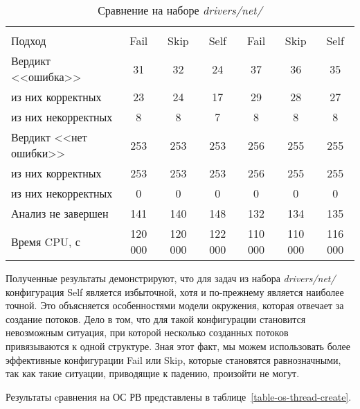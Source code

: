   \begin{table}[h]\footnotesize \centering
    \caption{Сравнение на наборе \textit{drivers/net/}}
  	\label{table-drivers-thread-create}
    \begin{tabular}{ | l | c | c | c | c | c | c |}
      \hline
      				& 		\multicolumn{3}{c|}{\theoryraces} 		& \multicolumn{3}{c|}{\combatmode} \\
      Подход         				& Fail 		& Skip 		& Self 		& Fail 	& Skip 		& Self  \\ \hline
      Вердикт <<ошибка>> 				& 31   		& 32   		& 24   		& 37   	& 36   		& 35   \\ 
  \hspace{0.5cm} из них корректных 	& 23 		& 24 		& 17   		& 29   	& 28   		& 27   \\ 
  \hspace{0.5cm} из них некорректных & 8 		& 8 		& 7   		& 8   	& 8   		& 8   \\ \hline
      Вердикт <<нет ошибки>>  		& 253    	& 253    	& 253   	& 256   & 255  		& 255   \\ 
  \hspace{0.5cm} из них корректных 	& 253 		& 253    	& 253   	& 256   & 255   	& 255   \\
  \hspace{0.5cm} из них некорректных & 0 		& 0    		& 0     	& 0   	& 0   		& 0   \\ \hline
      Анализ не завершен       		& 141    	& 140    	& 148    	& 132   & 134   	& 135   \\ \hline
      Время CPU, с   				& 120 000 	& 120 000 	& 122 000 	& 110 000 & 110 000 & 116 000   \\ 
      \hline
    \end{tabular}
  \end{table}

Полученные результаты демонстрируют, что для задач из набора \textit{drivers/net/} конфигурация Self является избыточной, хотя и по-прежнему является наиболее точной.
Это объясняется особенностями модели окружения, которая отвечает за создание потоков. 
Дело в том, что для такой конфигурации становится невозможным ситуация, при которой несколько созданных потоков привязываются к одной структуре.
Зная этот факт, мы можем использовать более эффективные конфигурации Fail или Skip, которые становятся равнозначными, так как такие ситуации, приводящие к падению, произойти не могут.

Результаты cравнения на ОС РВ представлены в таблице~\ref{table-os-thread-create}.


